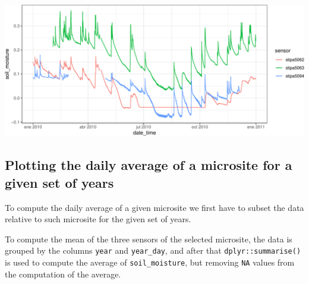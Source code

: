 \documentclass[]{article}
\newenvironment{Shaded}{\begin{snugshade}}{\end{snugshade}}
\newcommand{\DataTypeTok}[1]{\textcolor[rgb]{0.13,0.29,0.53}{#1}}
\newcommand{\DecValTok}[1]{\textcolor[rgb]{0.00,0.00,0.81}{#1}}
\newcommand{\KeywordTok}[1]{\textcolor[rgb]{0.13,0.29,0.53}{\textbf{#1}}}
\newcommand{\NormalTok}[1]{#1}
\newcommand{\OperatorTok}[1]{\textcolor[rgb]{0.81,0.36,0.00}{\textbf{#1}}}
\newcommand{\OtherTok}[1]{\textcolor[rgb]{0.56,0.35,0.01}{#1}}
\newcommand{\StringTok}[1]{\textcolor[rgb]{0.31,0.60,0.02}{#1}}
\begin{document}
\begin{Shaded}
\end{Shaded}

\includegraphics{moiscrust_files/figure-latex/unnamed-chunk-35-1.pdf}

\hypertarget{plotting-the-daily-average-of-a-microsite-for-a-given-set-of-years}{%
\subsection{Plotting the daily average of a microsite for a given set of
years}\label{plotting-the-daily-average-of-a-microsite-for-a-given-set-of-years}}

To compute the daily average of a given microsite we first have to
subset the data relative to such microsite for the given set of years.

To compute the mean of the three sensors of the selected microsite, the
data is grouped by the columns \texttt{year} and \texttt{year\_day}, and
after that \texttt{dplyr::summarise()} is used to compute the average of
\texttt{soil\_moisture}, but removing \texttt{NA} values from the
computation of the average.
\end{document}
